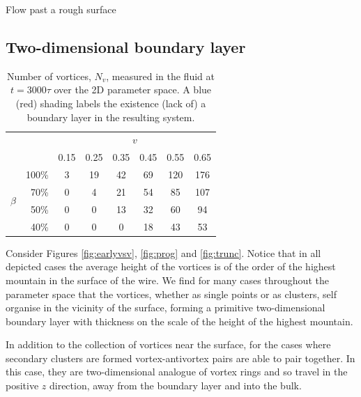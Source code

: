 \begin{chapter}{\label{cha:afm}Flow past a rough surface}
\subsection{Two-dimensional boundary layer}
\begin{table}
\centering
\begin{tabular}{cr|cccccc}
   & & \multicolumn{6}{c}{$v$}\\
   & & 0.15 & 0.25 & 0.35 & 0.45 & 0.55 & 0.65 \\
   \hline
  \multirow{4}{*}{$\beta$} & 100\% & \cellcolor{blue!50}3 & \cellcolor{blue!50}19 & \cellcolor{blue!50}42 & \cellcolor{red!50}69 & \cellcolor{red!50}120 & \cellcolor{red!50}176 \\
   &70\%& 0 & \cellcolor{blue!50}4 &  \cellcolor{blue!50}21 & \cellcolor{red!50}54 & \cellcolor{red!50}85 & \cellcolor{red!50}107 \\
   &50\%& 0 & 0 &  \cellcolor{blue!50}13 & \cellcolor{blue!50}32 & \cellcolor{red!50}60 & \cellcolor{red!50}94 \\
   &40\%& 0 & 0 &   0 & \cellcolor{blue!50}18 & \cellcolor{blue!50}43 & \cellcolor{red!50}53 \\
\end{tabular}
\caption{\label{tbl:nv_bl}Number of vortices, $N_v$, measured in the fluid at $t=3000\tau$ over the 2D parameter space. A blue (red) shading labels the existence (lack of) a boundary layer in the resulting system.}
\end{table}

Consider Figures \ref{fig:earlyvsv}, \ref{fig:prog} and \ref{fig:trunc}. Notice that in all depicted cases the average height of the vortices is of the order of the highest mountain in the surface of the wire. We find for many cases throughout the parameter space that the vortices, whether as single points or as clusters, self organise in the vicinity of the surface, forming a primitive two-dimensional boundary layer with thickness on the scale of the height of the highest mountain.

In addition to the collection of vortices near the surface, for the cases where secondary clusters are formed vortex-antivortex pairs are able to pair together. In this case, they are two-dimensional analogue of vortex rings and so travel in the positive $z$ direction, away from the boundary layer and into the bulk.


\end{chapter}
